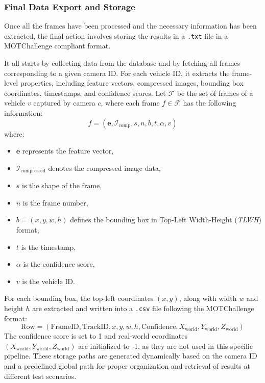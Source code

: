 \subsubsection{Final Data Export and Storage}
Once all the frames have been processed and the necessary information has been extracted, the final action involves storing the results in a \texttt{.txt} file in a MOTChallenge compliant format.

It all starts by collecting data from the database and by fetching all frames corresponding to a given camera ID. For each vehicle ID, it extracts the frame-level properties, including feature vectors, compressed images, bounding box coordinates, timestamps, and confidence scores. Let \( \mathcal{F} \) be the set of frames of a vehicle \( v \) captured by camera \( c \), where each frame \( f \in \mathcal{F} \) has the following information:
\[
    f = (\mathbf{e}, \mathcal{I}_{\text{comp}}, s, n, b, t, \alpha, v)
\]
where:
\begin{itemize}
    \item \( \mathbf{e} \) represents the feature vector,
    \item \( \mathcal{I}_{\text{compressed}} \) denotes the compressed image data,
    \item \( s \) is the shape of the frame,
    \item \( n \) is the frame number,
    \item \( b = (x, y, w, h) \) defines the bounding box in Top-Left Width-Height (\textit{TLWH}) format,
    \item \( t \) is the timestamp,
    \item \( \alpha \) is the confidence score,
    \item \( v \) is the vehicle ID.
\end{itemize}

For each bounding box, the top-left coordinates \((x, y)\), along with width \(w\) and height \(h\) are extracted and written into a \texttt{.csv} file following the MOTChallenge format:
\[
    \text{Row} = (\text{FrameID}, \text{TrackID}, x, y, w, h, \text{Confidence}, X_{\text{world}}, Y_{\text{world}}, Z_{\text{world}})
\]
The confidence score is set to 1 and real-world coordinates \( (X_{\text{world}}, Y_{\text{world}}, Z_{\text{world}}) \) are initialized to -1, as they are not used in this specific pipeline.
These storage paths are generated dynamically based on the camera ID and a predefined global path for proper organization and retrieval of results at different test scenarios.

